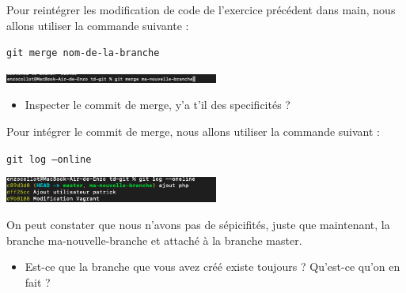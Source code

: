 \documentclass[12pt]{article}
\begin{document}
\vspace{0.3cm}

Pour reintégrer les modification de code de l'exercice précédent dans main, nous allons utiliser la commande suivante : 

\texttt{git merge nom-de-la-branche}

\vspace{0.3cm}

\begin{center}
  \includegraphics[width=7cm]{Image-TD-Git-3/git-merge.png}
\end{center}

\vspace{0.3cm}

\begin{itemize}
  \item Inspecter le commit de merge, y'a t'il des specificités ?
\end{itemize}

\vspace{0.3cm}

Pour intégrer le commit de merge, nous allons utiliser la commande suivant : 

\texttt{git log --online}

\vspace{0.3cm}

\begin{center}
  \includegraphics[width=7cm]{Image-TD-Git-3/git-log.png}
\end{center}

\vspace{0.3cm}

On peut constater que nous n'avons pas de sépicifités, juste que maintenant, la branche ma-nouvelle-branche et attaché à la branche master.

\vspace{0.3cm}

\begin{itemize}
  \item Est-ce que la branche que vous avez créé existe toujours ? Qu'est-ce qu'on en fait ?
\end{itemize}

\vspace{0.3cm}
\end{document}
